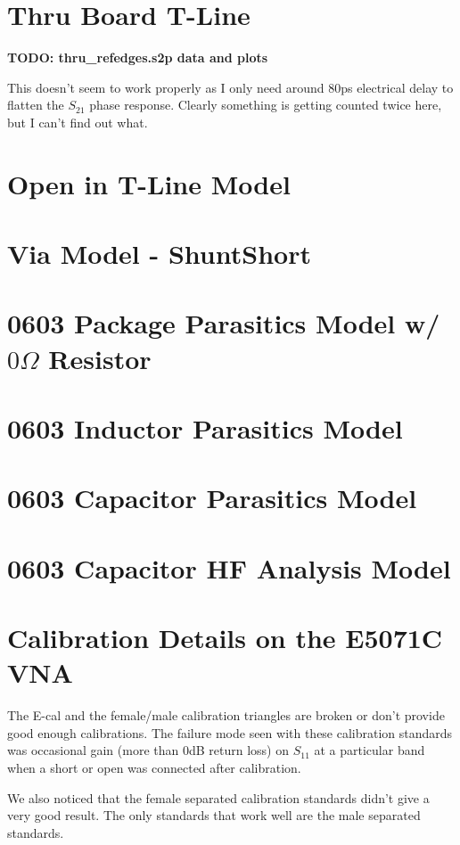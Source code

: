 \section{Thru Board T-Line}

\textbf{TODO: thru\_refedges.s2p data and plots}

This doesn't seem to work properly as I only need around 80ps electrical delay to flatten the $S_{21}$ phase response. Clearly something is getting counted twice here, but I can't find out what.

\section{Open in T-Line Model}

\section{Via Model - ShuntShort}

\section{0603 Package Parasitics Model w/ $0 \Omega$ Resistor}

\section{0603 Inductor Parasitics Model}

\section{0603 Capacitor Parasitics Model}

\section{0603 Capacitor HF Analysis Model}

\appendix
\section{Calibration Details on the E5071C VNA}
The E-cal and the female/male calibration triangles are broken or don't provide good enough calibrations.
The failure mode seen with these calibration standards was occasional gain (more than 0dB return loss) on $S_{11}$ at a particular band when a short or open was connected after calibration.

We also noticed that the female separated calibration standards didn't give a very good result. The only standards that work well are the male separated standards.

